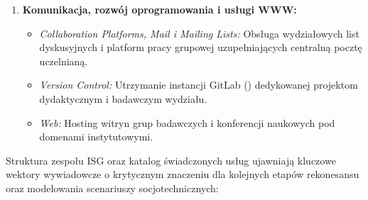 \begin{enumerate}
\begin{itemize}
    \end{itemize}
    \item \textbf{Komunikacja, rozwój oprogramowania i usługi WWW:}
    \begin{itemize}
        \item \textit{Collaboration Platforms, Mail i Mailing Lists:} Obsługa wydziałowych list dyskusyjnych i platform pracy grupowej uzupełniających centralną pocztę uczelnianą.
        \item \textit{Version Control:} Utrzymanie instancji GitLab () dedykowanej projektom dydaktycznym i badawczym wydziału.
        \item \textit{Web:} Hosting witryn grup badawczych i konferencji naukowych pod domenami instytutowymi.
    \end{itemize}
\end{enumerate}


Struktura zespołu ISG oraz katalog świadczonych usług ujawniają kluczowe wektory wywiadowcze o krytycznym znaczeniu dla kolejnych etapów rekonesansu oraz modelowania scenariuszy socjotechnicznych:

